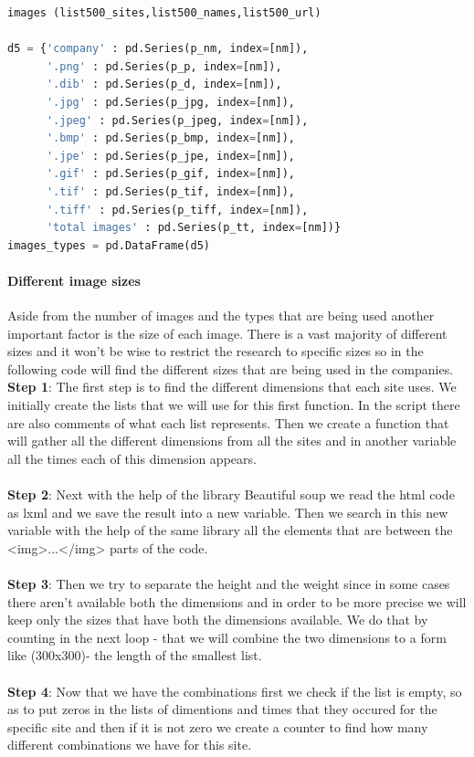 \documentclass{article}
\begin{document}
\begin{lstlisting}[language=Python]
images (list500_sites,list500_names,list500_url)

d5 = {'company' : pd.Series(p_nm, index=[nm]),
      '.png' : pd.Series(p_p, index=[nm]),
      '.dib' : pd.Series(p_d, index=[nm]),
      '.jpg' : pd.Series(p_jpg, index=[nm]),
      '.jpeg' : pd.Series(p_jpeg, index=[nm]),
      '.bmp' : pd.Series(p_bmp, index=[nm]),
      '.jpe' : pd.Series(p_jpe, index=[nm]),
      '.gif' : pd.Series(p_gif, index=[nm]),
      '.tif' : pd.Series(p_tif, index=[nm]),
      '.tiff' : pd.Series(p_tiff, index=[nm]), 
      'total images' : pd.Series(p_tt, index=[nm])}
images_types = pd.DataFrame(d5)    
\end{lstlisting}
\paragraph{Different image sizes}\label{dif_img_s} 
Aside from the number of images and the types that are being used another important factor is the size of each image. There is a vast majority of different sizes and it won't be wise to restrict the research to specific sizes so in the following code will find the different sizes that are being used in the companies.\\
\textbf{Step 1}: The first step is to find the different dimensions that each site uses. We initially create the lists that we will use for this first function. In the script there are also comments of what each list represents. Then we create a function that will gather all the different dimensions from all the sites and in another variable all the times each of this dimension appears. \\\\
\textbf{Step 2}: Next with the help of the library Beautiful soup we read the html code as lxml and we save the result into a new variable. Then we search in this new variable with the help of the same library all the elements that are between the <img>...</img> parts of the code.\\\\
\textbf{Step 3}: Then we try to separate the height and the weight since in some cases there aren't available both the dimensions and in order to be more precise we will keep only the sizes that have both the dimensions available. We do that by counting in the next loop - that we will combine the two dimensions to a form like (300x300)- the length of the smallest list. \\\\
\textbf{Step 4}: Now that we have the combinations first we check if the list is empty, so as to put zeros in the lists of dimentions and times that they occured for the specific site and then if it is not zero we create a counter to find how many different combinations we have for this site.\\\\
\end{document}
